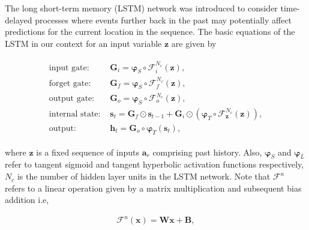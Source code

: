 \documentclass[preprint,12pt]{elsarticle}
\begin{document}
The long short-term memory (LSTM) network was introduced to consider time-delayed processes where events further back in the past may potentially affect predictions for the current location in the sequence. The basic equations of the LSTM in our context for an input variable $\mathbf{z}$ are given by
\begin{linenomath*}
\begin{align}
\begin{split}
\text{input gate: }& \boldsymbol{G}_{i}=\boldsymbol{\varphi}_{S} \circ \mathcal{F}_{i}^{N_{c}}(\mathbf{z}), \\
\text{forget gate: }& \boldsymbol{G}_{f}=\boldsymbol{\varphi}_{S} \circ \mathcal{F}_{f}^{N_{c}}(\mathbf{z}), \\
\text{output gate: }& \boldsymbol{G}_{o}=\boldsymbol{\varphi}_{S} \circ \mathcal{F}_{o}^{N_{c}}(\mathbf{z}), \\
\text{internal state: }& \boldsymbol{s}_{t}=\boldsymbol{G}_{f} \odot \boldsymbol{s}_{t-1}+\boldsymbol{G}_{i} \odot\left(\boldsymbol{\varphi}_{T} \circ \mathcal{F}_{\mathbf{z}}^{N_{c}}(\mathbf{z})\right), \\
\text{output: }& \mathbf{h}_t = \boldsymbol{G}_{o} \circ \boldsymbol{\varphi}_{T}\left(\boldsymbol{s}_{t}\right),
\end{split}
\end{align}
\end{linenomath*}
where $\mathbf{z}$ is a fixed sequence of inputs $\textbf{a}_r$ comprising past history. Also, $\boldsymbol{\varphi}_{S}$ and $\boldsymbol{\varphi}_{L}$ refer to tangent sigmoid and tangent hyperbolic activation functions respectively, $N_c$ is the number of hidden layer units in the LSTM network. Note that $\mathcal{F}^{n}$ refers to a linear operation given by a matrix multiplication and subsequent bias addition i.e,
\begin{linenomath*}
\begin{align}
\mathcal{F}^{n}(\boldsymbol{x})=\boldsymbol{W} \boldsymbol{x}+\boldsymbol{B},
\end{align}
\end{linenomath*}
\end{document}
